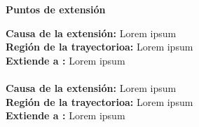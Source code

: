 
\begin{large}
	\textbf{Puntos de extensión}\\
\end{large}	

\textbf{Causa de la extensión:} Lorem ipsum\\
\textbf{Región de la trayectorioa:} Lorem ipsum\\
\textbf{Extiende a :} Lorem ipsum\\\\

\textbf{Causa de la extensión:} Lorem ipsum\\
\textbf{Región de la trayectorioa:} Lorem ipsum\\
\textbf{Extiende a :} Lorem ipsum\\

